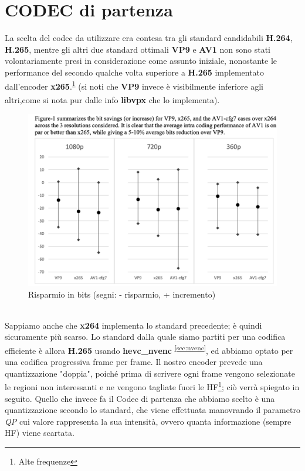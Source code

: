 \section{CODEC di partenza}
\label{sec:codec_base}
La scelta del codec da utilizzare era contesa tra gli standard candidabili \textbf{H.264}, \textbf{H.265}, mentre gli altri due standard ottimali \textbf{VP9} e \textbf{AV1} non sono stati volontariamente presi in considerazione come assunto iniziale, nonostante le performance del secondo qualche volta superiore a \textbf{H.265} implementato dall'encoder \textbf{x265}.\textsuperscript{\ref{fig:c}} (si noti che \textbf{VP9} invece è visibilmente inferiore agli altri,come si nota pur dalle info \textbf{libvpx}\textsuperscript{\cite{libvpx}} che lo implementa).
\begin{figure}
   \includegraphics[width=\linewidth]{images/x265vsAv1.png}
   \caption{Risparmio in bits (segni: - risparmio, + incremento)}
   \label{fig:c}
\end{figure}
\\Sappiamo anche che \textbf{x264} implementa lo standard precedente; è quindi sicuramente più scarso. Lo standard dalla quale siamo partiti per una codifica efficiente è allora \textbf{H.265} usando \textbf{hevc\_nvenc} \textsuperscript{\ref{sec:nvenc}}, ed abbiamo optato per una codifica progressiva frame per frame. Il nostro encoder prevede una quantizzazione "doppia", poiché prima di scrivere ogni frame vengono selezionate le regioni non interessanti e ne vengono tagliate fuori le HF\footnote{Alte frequenze}; ciò verrà spiegato in seguito. Quello che invece fa il Codec di partenza che abbiamo scelto è una quantizzazione secondo lo standard, che viene effettuata manovrando il parametro \emph{QP} cui valore rappresenta la sua intensità, ovvero quanta informazione (sempre HF) viene scartata.
